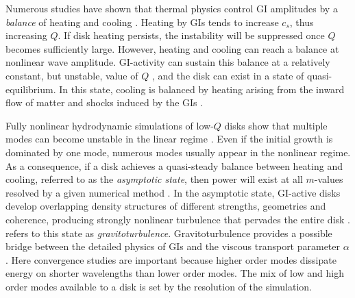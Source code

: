 \documentclass[manuscript]{aastex} %
\begin{document}
Numerous studies have shown that thermal physics control GI amplitudes by a {\it balance} of heating and cooling \citep[e.g.,][]{tomley1991,tomley1994,pickett1998,pickett2000, pickett2003,gammie2001,boss2002,rice2003b,mejia2005,boley2006,boley2007, stamatellos2008,cossins2009}.
Heating by GIs tends to increase $c_s$, thus increasing $Q$. If disk heating persists, the instability will be suppressed once $Q$ becomes sufficiently large.  However, heating and cooling can reach a balance at nonlinear wave amplitude. GI-activity can sustain this balance  at a relatively constant,
but unstable, value of $Q$ \citep{paczynski1978, lin1981,goldreich1965}, and 
the disk can exist in a state of quasi-equilibrium. In this state, cooling is 
balanced by heating arising from the inward flow of matter and shocks induced by the GIs
\citep{gammie2001, lodato2004, rice2005, boley2006, cossins2009, vorobyov2010}.

Fully nonlinear hydrodynamic simulations of low-$Q$ disks show that multiple
modes can become unstable in the linear regime \citep{nelson1998, pickett1998, lodato2004,boley2006,cossins2009}.  Even if the initial growth is dominated by one mode, numerous modes usually appear in the nonlinear regime. As a consequence, if a disk achieves a quasi-steady balance between heating and cooling, referred to as the {\it asymptotic state},
then power will exist at all $m$-values resolved by a given numerical method \citep{mejia2005,boley2006}.  
In the asymptotic state, GI-active disks develop overlapping density structures of different strengths, geometries and coherence, producing strongly nonlinear turbulence that pervades the entire disk \citep[e.g.][]{pickett2003, mejia2005,boley2006}.
\citet{gammie2001} refers to this state as {\it gravitoturbulence}. Gravitoturbulence provides a possible bridge between the detailed physics of GIs and the viscous transport parameter $\alpha$.  Here convergence studies are important because 
higher order modes dissipate energy on shorter wavelengths than lower order modes.  The mix of low and high order modes available to a disk is set by the resolution of the simulation.
\end{document}
